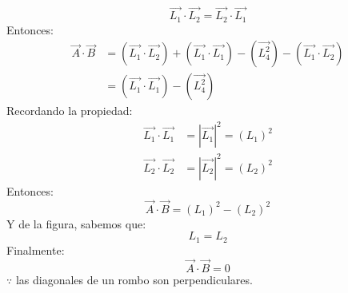 \documentclass[12pt,openany]{book}
\begin{document}
				$$
					\vec{L_{1}}\cdot\vec{L_{2}}=\vec{L_{2}}\cdot\vec{L_{1}}
				$$
				Entonces:
				\begin{equation*}
					\begin{split}
					\vec{A}\cdot\vec{B}&=(\vec{L_{1}}\cdot\vec{L_{2}})+
																(\vec{L_{1}}\cdot\vec{L_{1}})-
																(\vec{L_{4}^{2}})-
																(\vec{L_{1}}\cdot\vec{L_{2}}) \\
															&=(\vec{L_{1}}\cdot\vec{L_{1}})-
																(\vec{L_{4}^{2}})
					\end{split}
				\end{equation*}
				Recordando la propiedad:
				\begin{equation*}
					\begin{split}
						\vec{L_{1}}\cdot\vec{L_{1}}&=|\vec{L_{1}}|^{2}=(L_{1})^{2}\\
						\vec{L_{2}}\cdot\vec{L_{2}}&=|\vec{L_{2}}|^{2}=(L_{2})^{2}
					\end{split}
				\end{equation*}
				Entonces:
				$$	\vec{A}\cdot\vec{B}=(L_{1})^{2}-(L_{2})^{2} $$
				Y de la figura, sabemos que:
				$$ L_{1}=L_{2} $$
				Finalmente:
				$$ \vec{A}\cdot\vec{B}=0$$
				$\because$ las diagonales de un rombo son perpendiculares.
\end{document}
